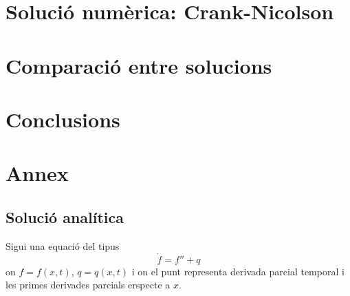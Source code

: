 \documentclass{article}
\begin{document}
\section{Solució numèrica: Crank-Nicolson}
\section{Comparació entre solucions}
\section{Conclusions}
\section{Annex}\label{Annex I}
\subsection{Solució analítica}
Sigui una equació del tipus
\begin{equation*}
    \dot{f} = f'' + q
\end{equation*}
on $f = f(x,t)$, $q =q(x,t)$ i on el punt representa derivada parcial temporal i les primes derivades parcials erspecte a $x$.
\end{document}
